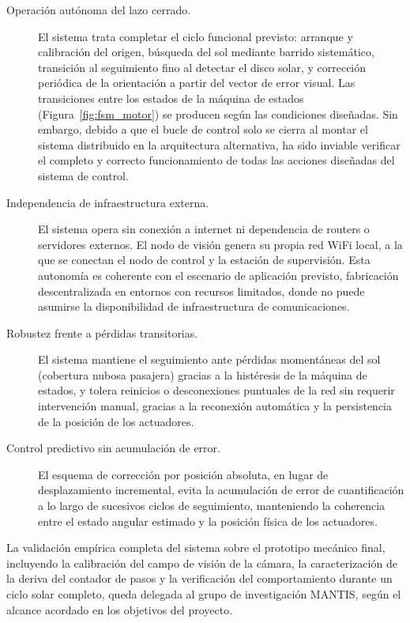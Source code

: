 \begin{description}
	\item[Operación autónoma del lazo cerrado.] El sistema trata completar el ciclo funcional previsto: arranque y calibración del origen, búsqueda del sol mediante barrido sistemático, transición al seguimiento fino al detectar el disco solar, y corrección periódica de la orientación a partir del vector de error visual. Las transiciones entre los estados de la máquina de estados (Figura~\ref{fig:fsm_motor}) se producen según las condiciones diseñadas. Sin embargo, debido a que el bucle de control solo se cierra al montar el sistema distribuido en la arquitectura alternativa, ha sido inviable verificar el completo y correcto funcionamiento de todas las acciones diseñadas del sistema de control.
	
	\item[Independencia de infraestructura externa.] El sistema opera sin conexión a internet ni dependencia de routers o servidores externos. El nodo de visión genera su propia red WiFi local, a la que se conectan el nodo de control y la estación de supervisión. Esta autonomía es coherente con el escenario de aplicación previsto, fabricación descentralizada en entornos con recursos limitados, donde no puede asumirse la disponibilidad de infraestructura de comunicaciones.
	
	\item[Robustez frente a pérdidas transitorias.] El sistema mantiene el seguimiento ante pérdidas momentáneas del sol (cobertura nubosa pasajera) gracias a la histéresis de la máquina de estados, y tolera reinicios o desconexiones puntuales de la red sin requerir intervención manual, gracias a la reconexión automática y la persistencia de la posición de los actuadores.
	
	\item[Control predictivo sin acumulación de error.] El esquema de corrección por posición absoluta, en lugar de desplazamiento incremental, evita la acumulación de error de cuantificación a lo largo de sucesivos ciclos de seguimiento, manteniendo la coherencia entre el estado angular estimado y la posición física de los actuadores.	
\end{description}

La validación empírica completa del sistema sobre el prototipo mecánico final, incluyendo la calibración del campo de visión de la cámara, la caracterización de la deriva del contador de pasos y la verificación del comportamiento durante un ciclo solar completo, queda delegada al grupo de investigación MANTIS, según el alcance acordado en los objetivos del proyecto.

